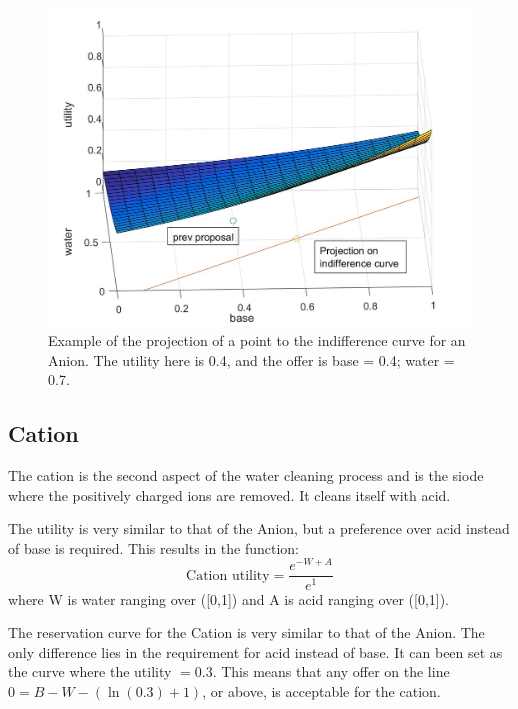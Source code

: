 \begin{figure}[h]
	\centering
	\includegraphics[width=0.7\linewidth]{img/projection_anion_example}
	\caption{Example of the projection of a point to the indifference curve for an Anion. The utility here is 0.4, and the offer is base = 0.4; water = 0.7.}
	\label{fig:projectionanionexample}
\end{figure}









\subsection{Cation}
The cation is the second aspect of the water cleaning process and is the siode where the positively charged ions are removed. It cleans itself with acid. %

The utility is very similar to that of the Anion, but a preference over acid instead of base is required. This results in the function:
\[
\text{Cation utility} = \frac{e^{-W+A}}{e^1}
\] 
where W is water ranging over ([0,1]) and A is acid ranging over ([0,1]).

The reservation curve for the Cation is very similar to that of the Anion. The only difference lies in the requirement for acid instead of base. It can been set as the curve where the utility $= 0.3$. This means that any offer on the line $0 = B - W - (\ln(0.3)+1)$, or above, is acceptable for the cation.

